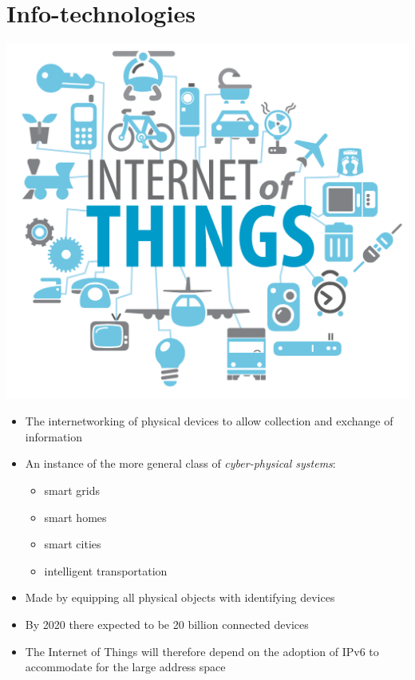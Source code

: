\documentclass{beamer}
\begin{document}
\section{Info-technologies}
\begin{frame}
	\begin{center}
		\includegraphics[scale=.5]{Internet_of_Things}
	\end{center}
\end{frame}
\begin{frame}
	\begin{itemize}
		\item The internetworking of physical devices to allow collection and exchange of information
		\item An instance of the more general class of \emph{cyber-physical systems}:
		\begin{itemize}
			\item smart grids
			\item smart homes
			\item smart cities
			\item intelligent transportation
		\end{itemize}
		\item Made by equipping all physical objects with identifying devices
		\item By 2020 there expected to be 20 billion connected devices
		\item The Internet of Things will therefore depend on the adoption of IPv6 to accommodate for the large address space 
	\end{itemize}
\end{frame}
\end{document}
